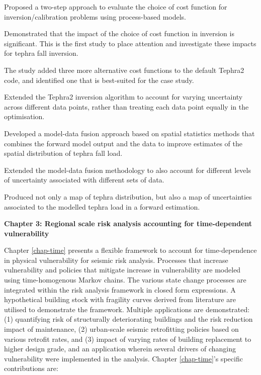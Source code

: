 \begin{enumerate}

Proposed a two-step approach to evaluate the choice of cost function for inversion/calibration problems using process-based models.

Demonstrated that the impact of the choice of cost function in inversion is significant. This is the first study to place attention and investigate these impacts for tephra fall inversion.

The study added three more alternative cost functions to the default Tephra2 code, and identified one that is best-suited for the case study.

Extended the Tephra2 inversion algorithm to account for varying uncertainty across different data points, rather than treating each data point equally in the optimisation.

Developed a model-data fusion approach based on spatial statistics methods that combines the forward model output and the data to improve estimates of the spatial distribution of tephra fall load. 

Extended the model-data fusion methodology to also account for different levels of uncertainty associated with different sets of data. 

Produced not only a map of tephra distribution, but also a map of uncertainties associated to the modelled tephra load in a forward estimation. 


\end{enumerate}



\vspace{1cm}
\noindent
\textbf{Chapter 3: Regional scale risk analysis accounting for time-dependent vulnerability}
\noindent

Chapter \ref{chap-time} presents a flexible framework to account for time-dependence in physical vulnerability for seismic risk analysis. Processes that increase vulnerability and policies that mitigate increase in vulnerability are modeled  using time-homogenous Markov chains. The various state change processes are integrated within the risk analysis framework in closed form expressions. A hypothetical building stock with fragility curves derived from literature are utilised to demonstrate the framework. Multiple applications are demonstrated: (1) quantifying risk of structurally deteriorating buildings and the risk reduction impact of maintenance, (2) urban-scale seismic retrofitting policies based on various retrofit rates, and (3) impact of varying rates of building replacement to higher design grade, and an application wherein several drivers of changing vulnerability were implemented in the analysis. Chapter \ref{chap-time}'s specific contributions are:

